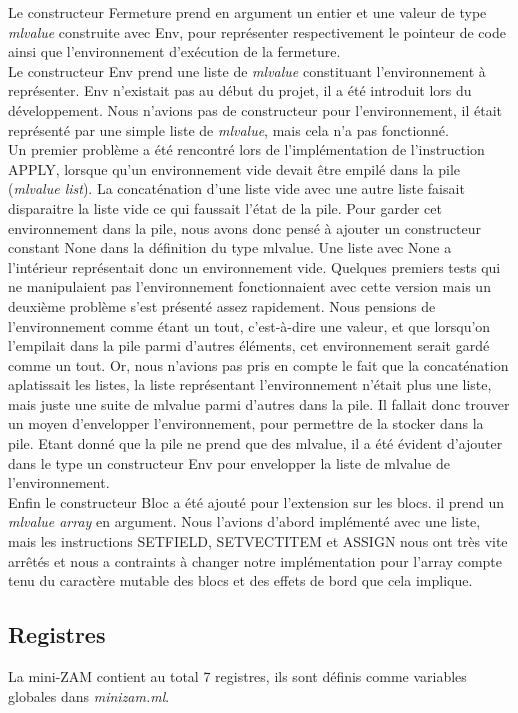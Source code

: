 \documentclass[11pt]{article}
\begin{document}
Le constructeur Fermeture prend en argument un entier et une valeur de type {\em mlvalue} construite avec Env, pour représenter respectivement le pointeur de code ainsi que l'environnement d'exécution de la fermeture.\\

Le constructeur Env prend une liste de {\em mlvalue} constituant l'environnement à représenter. Env n'existait pas au début du projet, il a été introduit lors du développement. Nous n'avions pas de constructeur pour l'environnement, il était représenté par une simple liste de {\em mlvalue}, mais cela n'a pas fonctionné. \\
Un premier problème a été rencontré lors de l'implémentation de l'instruction APPLY, lorsque qu'un environnement vide devait être empilé dans la pile ({\em mlvalue list}). La concaténation d'une liste vide avec une autre liste faisait disparaitre la liste vide ce qui faussait l'état de la pile. Pour garder cet environnement dans la pile, nous avons donc pensé à ajouter un constructeur constant None dans la définition du type mlvalue. Une liste avec None a l'intérieur représentait donc un environnement vide. Quelques premiers tests qui ne manipulaient pas l'environnement fonctionnaient avec cette version mais un deuxième problème s'est présenté assez rapidement. Nous pensions de l'environnement comme étant un tout, c'est-à-dire une valeur, et que lorsqu'on l'empilait dans la pile parmi d'autres éléments, cet environnement serait gardé comme un tout. Or, nous n'avions pas pris en compte le fait que la concaténation aplatissait les listes, la liste représentant l'environnement n'était plus une liste, mais juste une suite de mlvalue parmi d'autres dans la pile. Il fallait donc trouver un moyen d'envelopper l'environnement, pour permettre de la stocker dans la pile. Etant donné que la pile ne prend que des mlvalue, il a été évident d'ajouter dans le type un constructeur Env pour envelopper la liste de mlvalue de  l'environnement.\\

Enfin le constructeur Bloc a été ajouté pour l'extension sur les blocs. il prend un {\em mlvalue array} en argument. Nous l'avions d'abord implémenté avec une liste, mais les instructions SETFIELD, SETVECTITEM et ASSIGN nous ont très vite arrêtés et nous a contraints à changer notre implémentation pour l'array compte tenu du caractère mutable des blocs et des effets de bord que cela implique. \\
\newpage

\subsection{Registres}
La mini-ZAM contient au total 7 registres, ils sont définis comme variables globales dans {\em minizam.ml}.
\end{document}
